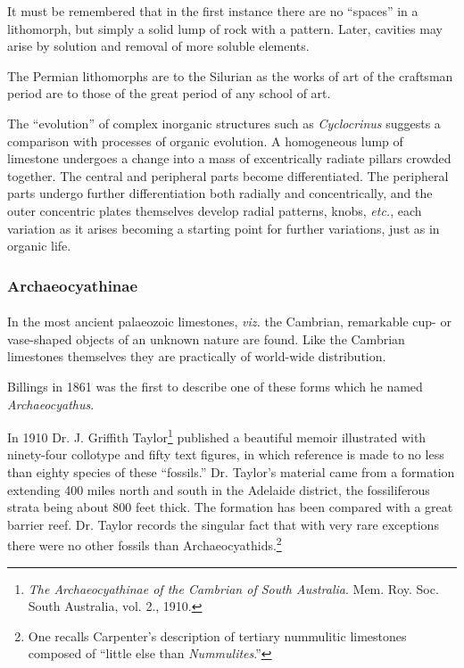 \documentclass[a4paper, 12pt, oneside, landscape]{article}
\begin{document}
It must be remembered that in the first instance there are no ``spaces'' in a lithomorph, but simply a solid lump of rock with a pattern. Later, cavities may arise by solution and removal of more soluble elements.

The Permian lithomorphs are to the Silurian as the works of art of the craftsman period are to those of the great period of any school of art.

The ``evolution'' of complex inorganic structures such as \emph{Cyclocrinus} suggests a comparison with processes of organic evolution. A homogeneous lump of limestone undergoes a change into a mass of excentrically radiate pillars crowded together. The central and peripheral parts become differentiated. The peripheral parts undergo further differentiation both radially and concentrically, and the outer concentric plates themselves develop radial patterns, knobs, \emph{etc.}, each variation as it arises becoming a starting point for further variations, just as in organic life.

\subsubsection{Archaeocyathinae}
\paragraph{}
In the most ancient palaeozoic limestones, \emph{viz.} the Cambrian, remarkable cup- or vase-shaped objects of an unknown nature are found. Like the Cambrian limestones themselves they are practically of world-wide distribution.

Billings in 1861 was the first to describe one of these forms which he named \emph{Archaeocyathus}.

In 1910 Dr. J. Griffith Taylor\footnote{\emph{The Archaeocyathinae of the Cambrian of South Australia}. Mem. Roy. Soc. South Australia, vol. 2., 1910.} published a beautiful memoir illustrated with ninety-four collotype and fifty text figures, in which reference is made to no less than eighty species of these ``fossils.'' Dr. Taylor's material came from a formation extending 400 miles north and south in the Adelaide district, the fossiliferous strata being about 800 feet thick. The formation has been compared with a great barrier reef. Dr. Taylor records the singular fact that with very rare exceptions there were no other fossils than Archaeocyathids.\footnote{One recalls Carpenter's description of tertiary nummulitic limestones composed of ``little else than \emph{Nummulites}.''}
\end{document}
